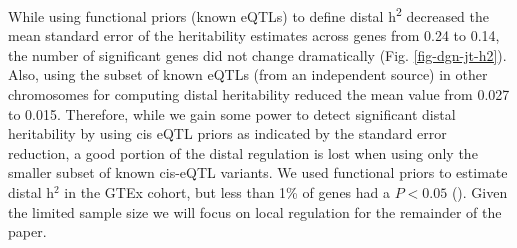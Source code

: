 \documentclass[10pt,letterpaper]{article}
\begin{document}
While using functional priors (known eQTLs) to define distal h\textsuperscript{2} decreased the mean standard error of the heritability estimates across genes from 0.24 to 0.14, the number of significant genes did not change dramatically (Fig. \ref{fig-dgn-jt-h2}). Also, using the subset of known eQTLs (from an independent source) in other chromosomes for computing distal heritability reduced the mean value from 0.027 to 0.015. Therefore, while we gain some power to detect significant distal heritability by using cis eQTL priors as indicated by the standard error reduction, a good portion of the distal regulation is lost when using only the smaller subset of known cis-eQTL variants. We used functional priors to estimate distal h$^2$ in the GTEx cohort, but less than 1\% of genes had a $P < 0.05$ (). Given the limited sample size we will focus on local regulation for the remainder of the paper.
\end{document}
